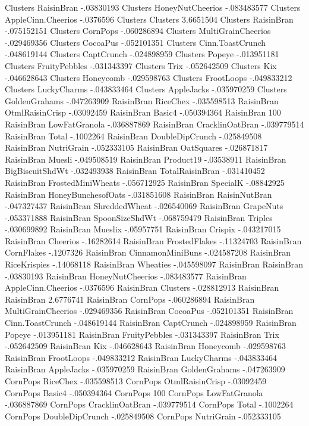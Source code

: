 Clusters	RaisinBran	-.03830193
Clusters	HoneyNutCheerios	-.083483577
Clusters	AppleCinn.Cheerios	-.0376596
Clusters	Clusters	3.6651504
Clusters	RaisinBran	-.075152151
Clusters	CornPops	-.060286894
Clusters	MultiGrainCheerios	-.029469356
Clusters	CocoaPus	-.052101351
Clusters	Cinn.ToastCrunch	-.048619144
Clusters	CaptCrunch	-.024898959
Clusters	Popeye	-.013951181
Clusters	FruityPebbles	-.031343397
Clusters	Trix	-.052642509
Clusters	Kix	-.046628643
Clusters	Honeycomb	-.029598763
Clusters	FrootLoops	-.049833212
Clusters	LuckyCharms	-.043833464
Clusters	AppleJacks	-.035970259
Clusters	GoldenGrahams	-.047263909
RaisinBran	RiceChex	-.035598513
RaisinBran	OtmlRaisinCrisp	-.03092459
RaisinBran	Basic4	-.050394364
RaisinBran	100%
RaisinBran	LowFatGranola	-.036887869
RaisinBran	CracklinOatBran	-.039779514
RaisinBran	Total	-.1002264
RaisinBran	DoubleDipCrunch	-.025849508
RaisinBran	NutriGrain	-.052333105
RaisinBran	OatSquares	-.026871817
RaisinBran	Muesli	-.049508519
RaisinBran	Product19	-.03538911
RaisinBran	BigBiscuitShdWt	-.032493938
RaisinBran	TotalRaisinBran	-.031410452
RaisinBran	FrostedMiniWheats	-.056712925
RaisinBran	SpecialK	-.08842925
RaisinBran	HoneyBunchesofOats	-.031851608
RaisinBran	RaisinNutBran	-.047327437
RaisinBran	ShreddedWheat	-.026540069
RaisinBran	GrapeNuts	-.053371888
RaisinBran	SpoonSizeShdWt	-.068759479
RaisinBran	Triples	-.030699892
RaisinBran	Mueslix	-.05957751
RaisinBran	Crispix	-.043217015
RaisinBran	Cheerios	-.16282614
RaisinBran	FrostedFlakes	-.11324703
RaisinBran	CornFlakes	-.1207326
RaisinBran	CinnamonMiniBuns	-.024587208
RaisinBran	RiceKrispies	-.14068118
RaisinBran	Wheaties	-.045598097
RaisinBran	RaisinBran	-.03830193
RaisinBran	HoneyNutCheerios	-.083483577
RaisinBran	AppleCinn.Cheerios	-.0376596
RaisinBran	Clusters	-.028812913
RaisinBran	RaisinBran	2.6776741
RaisinBran	CornPops	-.060286894
RaisinBran	MultiGrainCheerios	-.029469356
RaisinBran	CocoaPus	-.052101351
RaisinBran	Cinn.ToastCrunch	-.048619144
RaisinBran	CaptCrunch	-.024898959
RaisinBran	Popeye	-.013951181
RaisinBran	FruityPebbles	-.031343397
RaisinBran	Trix	-.052642509
RaisinBran	Kix	-.046628643
RaisinBran	Honeycomb	-.029598763
RaisinBran	FrootLoops	-.049833212
RaisinBran	LuckyCharms	-.043833464
RaisinBran	AppleJacks	-.035970259
RaisinBran	GoldenGrahams	-.047263909
CornPops	RiceChex	-.035598513
CornPops	OtmlRaisinCrisp	-.03092459
CornPops	Basic4	-.050394364
CornPops	100%
CornPops	LowFatGranola	-.036887869
CornPops	CracklinOatBran	-.039779514
CornPops	Total	-.1002264
CornPops	DoubleDipCrunch	-.025849508
CornPops	NutriGrain	-.052333105
